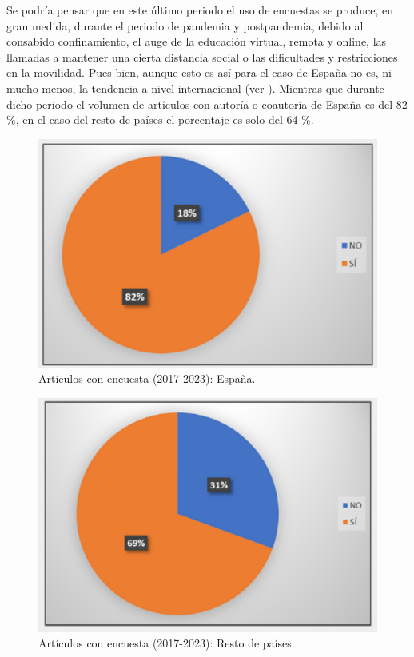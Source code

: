 \documentclass[spanish]{textolivre}
\begin{document}
Se podría pensar que en este último periodo el uso de encuestas se produce, en gran medida, durante el periodo de pandemia y postpandemia, debido al consabido confinamiento, el auge de la educación virtual, remota y online, las llamadas a mantener una cierta distancia social o las dificultades y restricciones en la movilidad. Pues bien, aunque esto es así para el caso de España no es, ni mucho menos, la tendencia a nivel internacional (ver ). Mientras que durante dicho periodo el volumen de artículos con autoría o coautoría de España es del 82 \%, en el caso del resto de países el porcentaje es solo del 64 \%.

\noindent
\begin{minipage}[b]{0.50\textwidth}
    \begin{figure}[H]
        \centering
        \includegraphics[width=\linewidth]{images/IMAGE11.png}
        \caption{Artículos con encuesta (2017-2023): España.}
        \label{fig-11}
    \end{figure}
\end{minipage}
\hfill
\begin{minipage}[b]{0.49\textwidth}
    \begin{figure}[H]
        \centering
        \includegraphics[width=\linewidth]{images/IMAGE12.png}
        \caption{Artículos con encuesta (2017-2023): Resto de países.}
        \label{fig-12}
    \end{figure}
\end{minipage}
\bigskip
\end{document}
